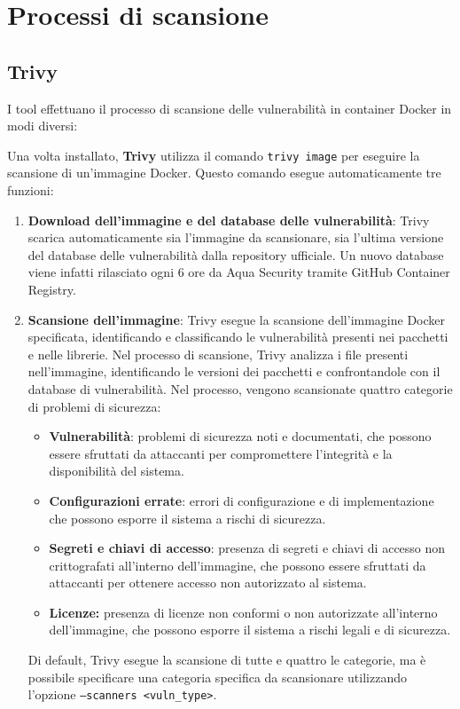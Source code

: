 \section{Processi di scansione}
\subsection{Trivy}
I tool effettuano il processo di scansione delle vulnerabilità in container Docker in modi diversi:

Una volta installato, \textbf{Trivy} utilizza il comando \texttt{trivy image} per eseguire la scansione di un'immagine Docker\cite{trivy_docs}. Questo comando esegue automaticamente tre funzioni:
\begin{enumerate}
   \item \textbf{Download dell'immagine e del database delle vulnerabilità}: Trivy scarica automaticamente sia l'immagine da scansionare, sia l'ultima versione del database delle vulnerabilità dalla repository ufficiale. Un nuovo database viene infatti rilasciato ogni 6 ore da Aqua Security tramite GitHub Container Registry.
   \item \textbf{Scansione dell'immagine}: Trivy esegue la scansione dell'immagine Docker specificata, identificando e classificando le vulnerabilità presenti nei pacchetti e nelle librerie. Nel processo di scansione, Trivy analizza i file presenti nell'immagine, identificando le versioni dei pacchetti e confrontandole con il database di vulnerabilità. Nel processo, vengono scansionate quattro categorie di problemi di sicurezza:
         \begin{itemize}
            \item \textbf{Vulnerabilità}: problemi di sicurezza noti e documentati, che possono essere sfruttati da attaccanti per compromettere l'integrità e la disponibilità del sistema.
            \item \textbf{Configurazioni errate}: errori di configurazione e di implementazione che possono esporre il sistema a rischi di sicurezza.
            \item \textbf{Segreti e chiavi di accesso}: presenza di segreti e chiavi di accesso non crittografati all'interno dell'immagine, che possono essere sfruttati da attaccanti per ottenere accesso non autorizzato al sistema.
            \item \textbf{Licenze:} presenza di licenze non conformi o non autorizzate all'interno dell'immagine, che possono esporre il sistema a rischi legali e di sicurezza.
         \end{itemize}
         Di default, Trivy esegue la scansione di tutte e quattro le categorie, ma è possibile specificare una categoria specifica da scansionare utilizzando l'opzione \texttt{--scanners <vuln\_type>}.


\end{enumerate}

